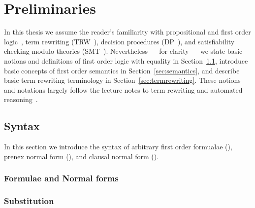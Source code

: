 
\chapter{Preliminaries}

%

In this thesis we assume the reader's familiarity with
propositional and first order logic~\cite{Huth:2004:LCS:975331},
term rewriting (TRW~\cite{Baader:1998:TR:280474}),
decision procedures (DP~\cite{Kroening:2008:DPA:1391237}),
and satisfiability checking modulo theories (SMT~\cite{Biere:2009:HSV:1550723}).
Nevertheless --- for clarity --- we state basic notions and  definitions
of first order logic with equality in Section~\ref{sec:syntax},
introduce basic concepts of first order semantics in Section~\ref{sec:semantics},
and describe basic term rewriting terminology in Section~\ref{sec:termrewriting}.
These notions and notations largely follow the lecture notes to term rewriting and automated reasoning~\cite{AM2015tr, GM2013ar}.


\section{Syntax}\label{sec:syntax}

In this section we introduce the syntax of arbitrary first order formualae (\FOF),
prenex normal form (\PNF),
and clausal normal form (\CNF).







\subsection{Formulae and Normal forms}





\subsection{Substitution}

